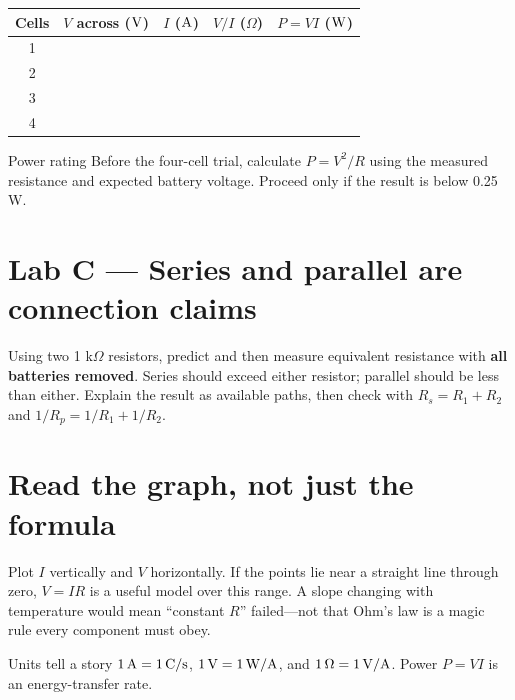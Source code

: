 \begin{tabularx}{\linewidth}{@{}C C C C C@{}}
\toprule
Cells & \(V\) across (\(\rm V\)) & \(I\) (\(\rm A\)) & \(V/I\) (\(\Omega\)) &
\(P=VI\) (\(\rm W\))\\ &&&&\\ 2&&&&\\ 3&&&&\\ 4&&&&\\ \bottomrule
\end{tabularx}

\begin{gate}{Power rating}
Before the four-cell trial, calculate \(P=V^2/R\) using the measured resistance
and expected battery voltage. Proceed only if the result is below 0.25 W.
\end{gate}

\section{Lab C — Series and parallel are connection claims}
Using two 1 k\(\Omega\) resistors, predict and then measure equivalent resistance
with \textbf{all batteries removed}. Series should exceed either resistor;
parallel should be less than either. Explain the result as available paths, then
check with \(R_s=R_1+R_2\) and \(1/R_p=1/R_1+1/R_2\).

\begin{labrecord}\end{labrecord}

\section{Read the graph, not just the formula}
Plot \(I\) vertically and \(V\) horizontally. If the points lie near a straight
line through zero, \(V=IR\) is a useful model over this range. A slope changing
with temperature would mean “constant \(R\)” failed—not that Ohm's law is a
magic rule every component must obey.

\begin{telospanel}{Units tell a story}
\(1\,{\rm A}=1\,{\rm C/s}\), \(1\,{\rm V}=1\,{\rm W/A}\), and
\(1\,\Omega=1\,{\rm V/A}\). Power \(P=VI\) is an energy-transfer rate.
\end{telospanel}


